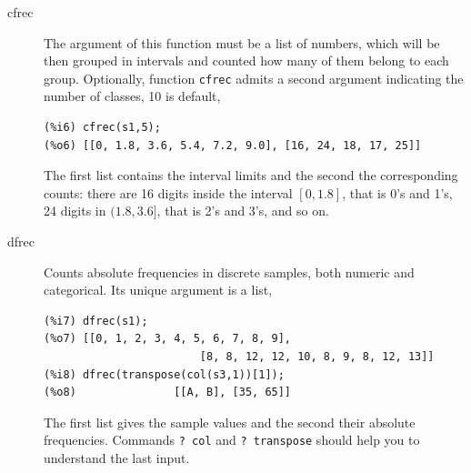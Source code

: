\documentclass[12pt,a4paper]{article}
\begin{document}
\begin{description}

\item[cfrec] The argument of this function must be a list of numbers, which will be then grouped in intervals and counted how many of them belong to each group. Optionally, function \verb|cfrec| admits a second argument indicating the number of classes, 10 is default,
\begin{verbatim}
(%i6) cfrec(s1,5);
(%o6) [[0, 1.8, 3.6, 5.4, 7.2, 9.0], [16, 24, 18, 17, 25]]
\end{verbatim}
The first list contains the interval limits and the second the corresponding counts: there are 16 digits inside the interval $[0, 1.8]$, that is 0's and 1's, 24 digits in $(1.8, 3.6]$, that is 2's and 3's, and so on.

\item[dfrec] Counts absolute frequencies in discrete samples, both numeric and categorical. Its unique argument is a list,
\begin{verbatim}
(%i7) dfrec(s1);
(%o7) [[0, 1, 2, 3, 4, 5, 6, 7, 8, 9],
                        [8, 8, 12, 12, 10, 8, 9, 8, 12, 13]]
(%i8) dfrec(transpose(col(s3,1))[1]);
(%o8)               [[A, B], [35, 65]]
\end{verbatim}
The first list gives the sample values and the second their absolute frequencies. Commands \verb|? col| and \verb|? transpose| should help you to understand the last input.



\end{description}
\end{document}
